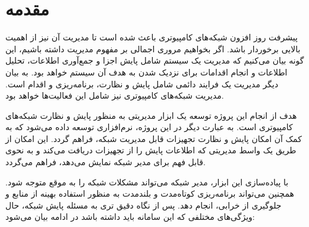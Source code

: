 \chapter{مقدمه}

پیشرفت روز افزون شبکه‌های کامپیوتری باعث شده است تا مدیریت آن نیز از اهمیت بالایی برخوردار باشد. اگر بخواهیم مروری اجمالی بر مفهوم مدیریت داشته باشیم، این گونه بیان می‌کنیم که مدیریت یک سیستم شامل پایش اجزا و جمع‌آوری اطلاعات، تحلیل اطلاعات و انجام اقدامات برای نزدیک شدن به هدف آن سیستم خواهد بود. به بیان دیگر مدیریت یک فرایند دائمی شامل پایش و نظارت، برنامه‌ریزی و اقدام است. مدیریت شبکه‌های کامپیوتری نیز شامل این فعالیت‌ها خواهد بود.

هدف از انجام این پروژه توسعه یک ابزار مدیریتی به منظور پایش و نظارت شبکه‌های کامپیوتری است. به عبارت دیگر در این پروژه، نرم‌افزاری توسعه داده می‌شود که به کمک آن امکان پایش و نظارت تجهیزات قابل مدیریت شبکه، فراهم گردد. این امکان از طریق یک واسط مدیریتی که اطلاعات پایش را از تجهیزات دریافت می‌کند و به نحوی قابل فهم برای مدیر شبکه نمایش می‌دهد، فراهم می‌گردد\cite{mauro2005essential}.

با پیاده‌سازی این ابزار، مدیر شبکه می‌تواند مشکلات شبکه را به موقع متوجه شود. همچنین می‌تواند برنامه‌ریزی کوتاه‌مدت و بلندمدت به منظور استفاده بهینه از منابع و جلوگیری از خرابی، انجام دهد. پس از نگاه دقیق تری به مسئله پایش شبکه، حال ویژگی‌های مختلفی که این سامانه باید داشته باشد در ادامه بیان می‌شود:

